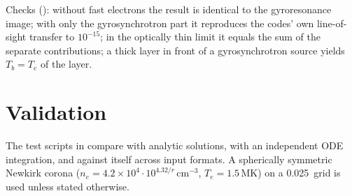 Checks (): without fast electrons the result is identical to
the gyroresonance image; with only the gyrosynchrotron part it reproduces the codes' own
line-of-sight transfer to $10^{-15}$; in the optically thin limit it equals the sum of
the separate contributions; a thick layer in front of a gyrosynchrotron source yields
$T_b=T_e$ of the layer.

\chapter{Validation}\label{chap:validation}

The test scripts in  compare  with analytic solutions,
with an independent ODE integration, and against itself across input formats. A
spherically symmetric Newkirk corona ($n_e=4.2\times10^{4}\cdot10^{4.32/r}$\,cm$^{-3}$,
$T_e=1.5$\,MK) on a 0.025\,\rsun{} grid is used unless stated otherwise.

